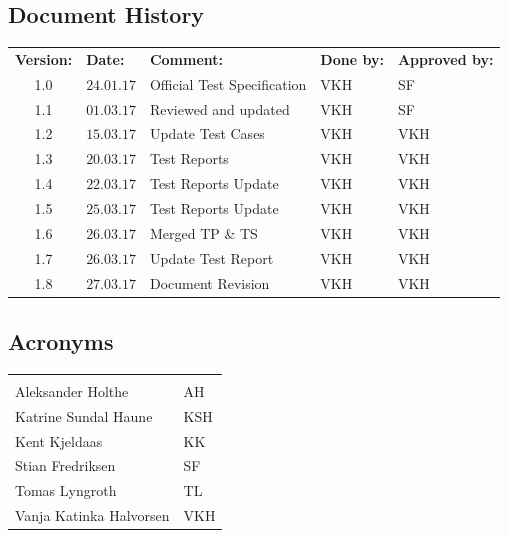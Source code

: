 \documentclass{article}
\begin{document}
\begin{center}
\section*{\textbf{Document History}}
\begin{tabular}{cllll}
\rowcolor{cadetgrey}
\textbf{Version:}    &\textbf{Date:} 	 &\textbf{Comment:}    &\textbf{Done by:}   &\textbf{Approved by:}  \\
1.0     & $24.01.17$    & Official Test Specification & VKH & SF \\
\rowcolor{gainsboro}1.1     & $01.03.17$    & Reviewed and updated & VKH & SF \\
1.2     & $15.03.17$    & Update Test Cases & VKH & VKH \\
\rowcolor{gainsboro}1.3     & $20.03.17$    & Test Reports & VKH & VKH \\
1.4     & $22.03.17$    & Test Reports Update & VKH & VKH \\
\rowcolor{gainsboro}1.5     & $25.03.17$    & Test Reports Update & VKH & VKH \\
1.6     & $26.03.17$    & Merged TP \& TS & VKH & VKH \\
\rowcolor{gainsboro}1.7     & $26.03.17$    & Update Test Report & VKH & VKH \\
1.8     & $27.03.17$    & Document Revision & VKH & VKH \\
\end{tabular}                                                                   
\end{center}
\vspace*{0.5 cm}

\begin{center}
\section*{\textbf{Acronyms}}
\begin{tabular}{ll}
\rowcolor{cadetgrey}
    &   \\
Aleksander Holthe      & AH     
 \\\rowcolor{gainsboro}
Katrine Sundal Haune  & KSH \\
Kent Kjeldaas         & KK 
 \\\rowcolor{gainsboro}
Stian Fredriksen      & SF  \\
Tomas Lyngroth       & TL   
 \\\rowcolor{gainsboro}
Vanja Katinka Halvorsen     & VKH   \\
\end{tabular}                                                             
\end{center}
\end{document}
